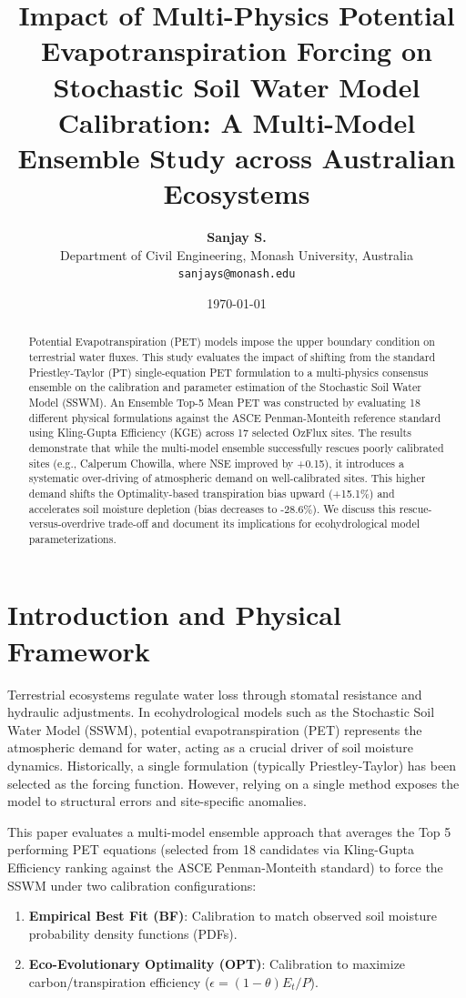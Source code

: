 \documentclass[11pt,a4paper]{article}
\title{\textbf{Impact of Multi-Physics Potential Evapotranspiration Forcing on Stochastic Soil Water Model Calibration: A Multi-Model Ensemble Study across Australian Ecosystems}}
\author{\textbf{Sanjay S.} \\ Department of Civil Engineering, Monash University, Australia \\ \texttt{sanjays@monash.edu}}
\date{\today}
\begin{document}
\maketitle

\begin{abstract}
Potential Evapotranspiration (PET) models impose the upper boundary condition on terrestrial water fluxes. This study evaluates the impact of shifting from the standard Priestley-Taylor (PT) single-equation PET formulation to a multi-physics consensus ensemble on the calibration and parameter estimation of the Stochastic Soil Water Model (SSWM). An Ensemble Top-5 Mean PET was constructed by evaluating 18 different physical formulations against the ASCE Penman-Monteith reference standard using Kling-Gupta Efficiency (KGE) across 17 selected OzFlux sites. The results demonstrate that while the multi-model ensemble successfully rescues poorly calibrated sites (e.g., Calperum Chowilla, where NSE improved by +0.15), it introduces a systematic over-driving of atmospheric demand on well-calibrated sites. This higher demand shifts the Optimality-based transpiration bias upward (+15.1\%) and accelerates soil moisture depletion (bias decreases to -28.6\%). We discuss this rescue-versus-overdrive trade-off and document its implications for ecohydrological model parameterizations.
\end{abstract}

\section{Introduction and Physical Framework}
Terrestrial ecosystems regulate water loss through stomatal resistance and hydraulic adjustments. In ecohydrological models such as the Stochastic Soil Water Model (SSWM), potential evapotranspiration (PET) represents the atmospheric demand for water, acting as a crucial driver of soil moisture dynamics. Historically, a single formulation (typically Priestley-Taylor) has been selected as the forcing function. However, relying on a single method exposes the model to structural errors and site-specific anomalies. 

This paper evaluates a multi-model ensemble approach that averages the Top 5 performing PET equations (selected from 18 candidates via Kling-Gupta Efficiency ranking against the ASCE Penman-Monteith standard) to force the SSWM under two calibration configurations:
\begin{enumerate}
    \item \textbf{Empirical Best Fit (BF)}: Calibration to match observed soil moisture probability density functions (PDFs).
    \item \textbf{Eco-Evolutionary Optimality (OPT)}: Calibration to maximize carbon/transpiration efficiency ($\epsilon = (1-\theta)E_t / P$).
\end{enumerate}
\end{document}
